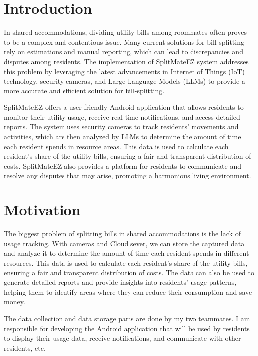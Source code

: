 \documentclass[sigconf,nonacm]{acmart}\settopmatter{printfolios=true}
\begin{document}
\section{Introduction}
In shared accommodations, dividing utility bills among roommates often proves to be a complex and contentious issue. Many current solutions for bill-splitting rely on estimations and manual reporting, which can lead to discrepancies and disputes among residents. The implementation of SplitMateEZ system addresses this problem by leveraging the latest advancements in Internet of Things (IoT) technology, security cameras, and Large Language Models (LLMs) to provide a more accurate and efficient solution for bill-splitting.  

SplitMateEZ offers a user-friendly Android application that allows residents to monitor their utility usage, receive real-time notifications, and access detailed reports. The system uses security cameras to track residents' movements and activities, which are then analyzed by LLMs to determine the amount of time each resident spends in resource areas. This data is used to calculate each resident's share of the utility bills, ensuring a fair and transparent distribution of costs. SplitMateEZ also provides a platform for residents to communicate and resolve any disputes that may arise, promoting a harmonious living environment.

\section{Motivation}
The biggest problem of splitting bills in shared accommodations is the lack of usage tracking. With cameras and Cloud sever, we can store the captured data and analyze it to determine the amount of time each resident spends in different resources. This data is used to calculate each resident's share of the utility bills, ensuring a fair and transparent distribution of costs. The data can also be used to generate detailed reports and provide insights into residents' usage patterns, helping them to identify areas where they can reduce their consumption and save money.  

The data collection and data storage parts are done by my two teammates. I am responsible for developing the Android application that will be used by residents to display their usage data, receive notifications, and communicate with other residents, etc.
\end{document}
